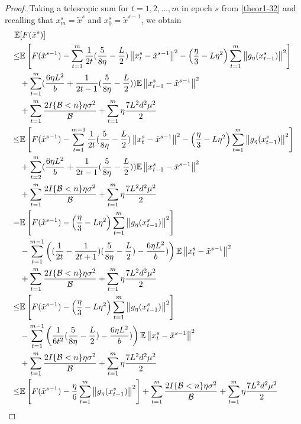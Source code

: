 \documentclass{article}
\newcommand*{\E}{\mathbb{E}}
\newcommand{\norm}[1]{\left\lVert#1\right\rVert}
\theoremstyle{definition}
\theoremstyle{remark}
\begin{document}
\begin{proof}
Taking a telescopic sum for $t = 1, 2, \ldots, m$ in epoch $s$ from \eqref{theor1-32} and recalling that $x_m^s = \tilde{x}^s$ and $x_0^s = \tilde{x}^{s-1}$, we obtain
 \begin{align} 
\E&[F(\tilde{x}^s)] \notag
\\ \leq& \E\left[F(\tilde{x}^{s-1})  -\sum_{t=1}^m\frac{1}{2t}(\frac{5}{8\eta} - \frac{L}{2})\norm{{x}_t^s-\tilde{x}^{s-1}}^2- \left(\frac{\eta}{3}-L\eta^2\right)\sum_{t=1}^m\norm{g_{\eta}(x_{t-1}^s)}^2\right]\notag\\
&+\sum_{t=1}^m(\frac{6\eta L^2}{b}+\frac{1}{2t-1}(\frac{5}{8\eta} - \frac{L}{2}))\E\norm{x_{t-1}^s-\tilde{x}^{s-1}}^2\notag\\
&+ \sum_{t=1}^m \frac{2I\{\mathcal{B} < n\}\eta \sigma ^2}{\mathcal{B}}+\sum_{t=1}^m \eta \frac{7L^2 d^2 \mu^2}{2}\notag\\
\leq& \E\left[F(\tilde{x}^{s-1})  -\sum_{t=1}^{m-1}\frac{1}{2t}(\frac{5}{8\eta} - \frac{L}{2})\norm{{x}_t^s-\tilde{x}^{s-1}}^2- \left(\frac{\eta}{3}-L\eta^2\right)\sum_{t=1}^m\norm{g_{\eta}(x_{t-1}^s)}^2\right]\notag\\
&+\sum_{t=2}^m(\frac{6\eta L^2}{b}+\frac{1}{2t-1}(\frac{5}{8\eta} - \frac{L}{2}))\E\norm{x_{t-1}^s-\tilde{x}^{s-1}}^2\notag\\
&+ \sum_{t=1}^m \frac{2I\{\mathcal{B} < n\}\eta \sigma ^2}{\mathcal{B}}+\sum_{t=1}^m \eta \frac{7L^2 d^2 \mu^2}{2}\label{theor1-34}
\\
=& \E\left[F(\tilde{x}^{s-1}) - \left(\frac{\eta}{3}-L\eta^2\right)\sum_{t=1}^m\norm{g_{\eta}(x_{t-1}^s)}^2\right]\notag\\
&-\sum_{t=1}^{m-1}\left((\frac{1}{2t} - \frac{1}{2t+1})(\frac{5}{8\eta} - \frac{L}{2})-\frac{6\eta L^2 }{b})\right)\E\norm{x_{t}^s-\tilde{x}^{s-1}}^2\notag\\
&+ \sum_{t=1}^m \frac{2I\{\mathcal{B} < n\}\eta \sigma ^2}{\mathcal{B}}+\sum_{t=1}^m \eta \frac{7 L^2 d^2 \mu^2}{2}\notag\\
\leq& \E\left[F(\tilde{x}^{s-1}) - \left(\frac{\eta}{3}-L\eta^2\right)\sum_{t=1}^m\norm{g_{\eta}(x_{t-1}^s)}^2\right]\notag\\
&-\sum_{t=1}^{m-1}\left(\frac{1}{6t^2}(\frac{5}{8\eta} - \frac{L}{2})-\frac{6\eta L^2 }{b})\right)\E\norm{x_{t}^s-\tilde{x}^{s-1}}^2\notag\\
&+ \sum_{t=1}^m \frac{2I\{\mathcal{B} < n\}\eta \sigma ^2}{\mathcal{B}}+\sum_{t=1}^m \eta \frac{7 L^2 d^2 \mu^2}{2}\notag\\
\leq& \E\left[F(\tilde{x}^{s-1}) - \frac{\eta}{6}\sum_{t=1}^m\norm{g_{\eta}(x_{t-1}^s)}^2\right]+ \sum_{t=1}^m \frac{2I\{\mathcal{B} < n\}\eta \sigma ^2}{\mathcal{B}}+\sum_{t=1}^m \eta \frac{7 L^2 d^2 \mu^2}{2}\label{theor1-35}

\end{align}
\end{proof}
\end{document}

